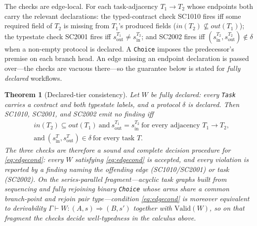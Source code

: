 \documentclass[11pt]{article}
\newcommand{\code}[1]{\textsf{\small #1}}
\theoremstyle{plain}
\newtheorem{theorem}{Theorem}
\theoremstyle{definition}
\theoremstyle{remark}
\begin{document}
The checks are edge-local. For each task-adjacency $T_1\!\to\!T_2$ whose endpoints both carry
the relevant declarations: the typed-contract check \code{SC1010} fires iff some required field
of $T_2$ is missing from $T_1$'s produced fields
($\mathit{in}(T_2)\not\subseteq\mathit{out}(T_1)$); the typestate check \code{SC2001} fires iff
$s_{\mathrm{out}}^{T_1}\neq s_{\mathrm{in}}^{T_2}$; and \code{SC2002} fires iff
$(s_{\mathrm{in}}^{T_2},s_{\mathrm{out}}^{T_2})\notin\delta$ when a non-empty protocol is
declared. A \texttt{Choice} imposes the predecessor's premise on each branch head. An edge
missing an endpoint declaration is passed over---the checks are vacuous there---so the guarantee
below is stated for \emph{fully declared} workflows.

\begin{theorem}[Declared-tier consistency]\label{thm:typecheck}
Let $W$ be \emph{fully declared}: every \texttt{Task} carries a contract and both typestate
labels, and a protocol $\delta$ is declared. Then \code{SC1010}, \code{SC2001}, and \code{SC2002}
emit no finding \emph{iff}
\begin{equation}
\begin{aligned}
  &\mathit{in}(T_2)\subseteq\mathit{out}(T_1)\ \text{and}\ s_{\mathrm{out}}^{T_1}=s_{\mathrm{in}}^{T_2}
  \ \text{for every adjacency } T_1\!\to\!T_2,\\
  &\text{and}\ (s_{\mathrm{in}}^{T},s_{\mathrm{out}}^{T})\in\delta \ \text{for every task } T.
\end{aligned}
\tag{$\ast$}\label{eq:edgecond}
\end{equation}
The three checks are therefore a \emph{sound and complete} decision procedure for
\eqref{eq:edgecond}: every $W$ satisfying \eqref{eq:edgecond} is accepted, and every violation is
reported by a finding naming the offending edge (\code{SC1010}/\code{SC2001}) or task
(\code{SC2002}). On the \emph{series-parallel fragment}---acyclic task graphs built from
sequencing and fully rejoining binary \texttt{Choice} whose arms share a common branch-point and
rejoin pair type---condition \eqref{eq:edgecond} is moreover equivalent to derivability
$\Gamma\vdash W:(A,s)\Rightarrow(B,s')$ together with $\mathrm{Valid}(W)$, so on that fragment the
checks decide well-typedness in the calculus above.
\end{theorem}
\end{document}
